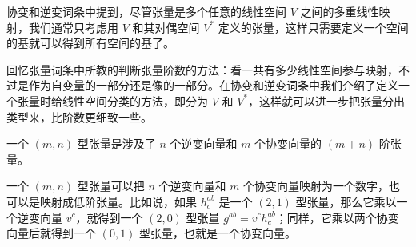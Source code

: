 
\begin{issues}
\issueDraft
\end{issues}


协变和逆变词条中提到，尽管张量是多个任意的线性空间 $V$ 之间的多重线性映射，我们通常只考虑用 $V$ 和其对偶空间 $V^*$ 定义的张量，这样只需要定义一个空间的基就可以得到所有空间的基了。

回忆张量词条中所教的判断张量阶数的方法：看一共有多少线性空间参与映射，不过是作为自变量的一部分还是像的一部分。在协变和逆变词条中我们介绍了定义一个张量时给线性空间分类的方法，即分为 $V$ 和 $V^*$，这样就可以进一步把张量分出类型来，比阶数更细致一些。

\begin{definition}{}
一个 $(m, n)$ 型张量是涉及了 $n$ 个逆变向量和 $m$ 个协变向量的 $(m+n)$ 阶张量。
\end{definition}

一个 $(m, n)$ 型张量可以把 $n$ 个逆变向量和 $m$ 个协变向量映射为一个数字，也可以是映射成低阶张量。比如说，如果 $h^{ab}_c$ 是一个 $(2, 1)$ 型张量，那么它乘以一个逆变向量 $v^c$，就得到一个 $(2, 0)$ 型张量 $g^{ab}=v^ch^{ab}_c$；同样，它乘以两个协变向量后就得到一个 $(0, 1)$ 型张量，也就是一个协变向量。









